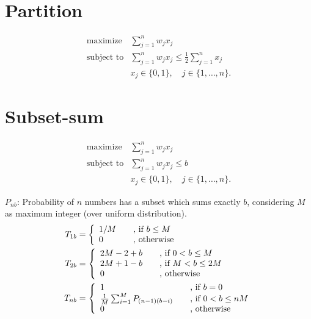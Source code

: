 \documentclass{article}
\title{}
\author{Marcos Daniel Baroni}
\begin{document}
\section{Partition}
\begin{align*}
  \text{maximize} & \sum_{j=1}^n w_j x_j \\
  \text{subject to} & \sum_{j=1}^n w_j x_j \leq \frac{1}{2} \sum_{j=1}^n x_j \\
   & x_j \in \{0, 1\}, \quad j \in \{1, \ldots, n\}.
\end{align*}

\section{Subset-sum}
\begin{align*}
  \text{maximize} & \sum_{j=1}^n w_j x_j \\
  \text{subject to} & \sum_{j=1}^n w_j x_j \leq b\\
   & x_j \in \{0, 1\}, \quad j \in \{1, \ldots, n\}.
\end{align*}

$P_{nb}$: Probability of $n$ numbers has a subset which sums exactly $b$,
considering $M$ as maximum integer (over uniform distribution).
\begin{align*}
  T_{1b} &= \left\{
    \begin{array}{l l}
      1/M & \quad \text{, if $b \leq M $}\\
      0 & \quad \text{, otherwise}
    \end{array}
  \right. \\
  T_{2b} &= \left\{
    \begin{array}{l l}
      2M-2+b & \quad \text{, if $ 0 < b \leq M $}\\
      2M+1-b & \quad \text{, if $ M < b \leq 2M $}\\
      0 & \quad \text{, otherwise}
    \end{array}
  \right.\\
  T_{nb} &= \left\{
    \begin{array}{l l}
      1 & \quad \text{, if $b = 0$}\\
      \frac{1}{M} \sum_{i=1}^M P_{(n-1)(b-i)} & \quad \text{, if $0 < b \leq nM$}\\
      0 & \quad \text{, otherwise}
    \end{array}
  \right.
\end{align*}
\end{document}
